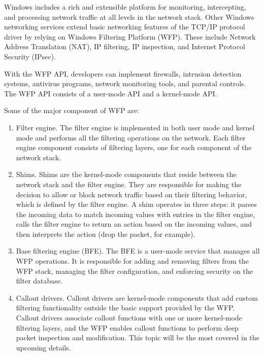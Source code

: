 \vspace{5mm}

\cite{BOOK:1} Windows includes a rich and extensible platform for monitoring, intercepting, and processing
network traffic at all levels in the network stack. Other Windows networking services extend basic
networking features of the TCP/IP protocol driver by relying on Windows Filtering Platform (WFP).
These include Network Address Translation (NAT), IP filtering, IP inspection, and Internet Protocol
Security (IPsec).

\vspace{5mm}

With the WFP API, developers can implement firewalls, intrusion detection systems, antivirus programs, network monitoring tools, and parental controls. The WFP API consists of a user-mode API and a kernel-mode API.

\vspace{5mm}

Some of the major component of WFP are:
\begin{enumerate}

\item Filter engine. The filter engine is implemented in both user mode and kernel mode and performs all the filtering operations on the network. Each filter engine component consists of
filtering layers, one for each component of the network stack.

\item Shims. Shims are the kernel-mode components that reside between the network stack and the filter engine. They are responsible for making the decision to allow or block network traffic
based on their filtering behavior, which is defined by the filter engine. A shim operates in three steps: it parses the incoming data to match incoming values with entries in the filter engine,
calls the filter engine to return an action based on the incoming values, and then interprets the action (drop the packet, for example).

\item Base filtering engine (BFE). The BFE is a user-mode service that manages all WFP operations. It is responsible for adding and removing filters from the WFP stack, managing the filter 
configuration, and enforcing security on the filter database.

\item Callout drivers. Callout drivers are kernel-mode components that add custom filtering functionality outside the basic support provided by the WFP. Callout drivers associate callout 
functions with one or more kernel-mode filtering layers, and the WFP enables callout functions to perform deep packet inspection and modification. This topic will be the most covered in the
upcoming details.

\end{enumerate}

